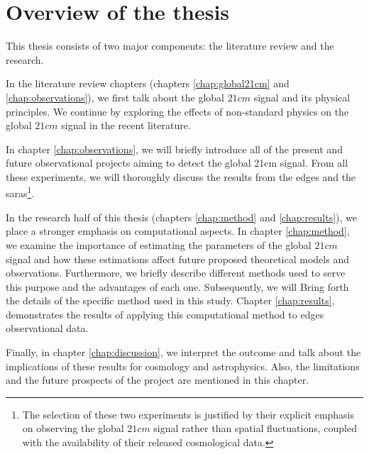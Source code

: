 \documentclass[12pt, TexShade, letterpaper]{report}
\begin{document}
\section{Overview of the thesis}
This thesis consists of two major components: the literature review and the research.\par
In the literature review chapters (chapters \ref{chap:global21cm} and \ref{chap:observations}), we first talk about the global $21cm$ signal and its physical principles. We continue by exploring the effects of non-standard physics on the global $21cm$ signal in the recent literature. \par
In chapter \ref{chap:observations}, we will briefly introduce all of the present and future observational projects aiming to detect the global 21cm signal. From all these experiments, we will thoroughly discuss the results from the \gls{edges} and the \gls{saras}\footnote{The selection of these two experiments is justified by their explicit emphasis on observing the global $21cm$ signal rather than spatial fluctuations, coupled with the availability of their released cosmological data.}.\par
In the research half of this thesis (chapters \ref{chap:method} and \ref{chap:results}), we place a stronger emphasis on computational aspects. 
In chapter \ref{chap:method}, we examine the importance of estimating the parameters of the global $21cm$ signal and how these estimations affect future proposed theoretical models and observations. Furthermore, we briefly describe different methods used to serve this purpose and the advantages of each one.
Subsequently, we will Bring forth the details of the specific method used in this study. 
Chapter \ref{chap:results}, demonstrates the results of applying this computational method to \gls{edges} observational data.\par

Finally, in chapter \ref{chap:discussion}, we interpret the outcome and talk about the implications of these results for cosmology and astrophysics. Also, the limitations and the future prospects of the project are mentioned in this chapter.\par
\end{document}
